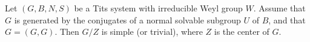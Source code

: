 Let $(G, B, N, S)$ be a Tits system with irreducible Weyl group $W$. Assume that $G$ is generated by the conjugates of a normal solvable subgroup $U$ of $B$, and that $G = (G, G)$. Then $G/Z$ is simple (or trivial), where $Z$ is the center of $G$.
